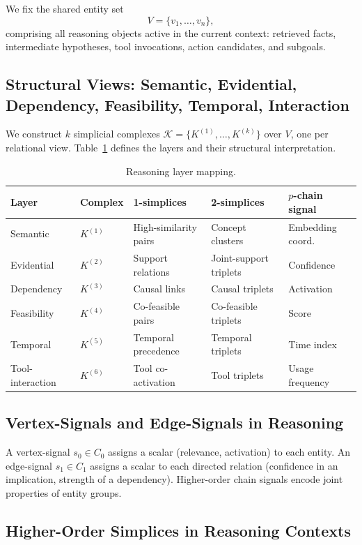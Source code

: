 \documentclass[11pt]{article}
\theoremstyle{definition}
\theoremstyle{remark}
\newcommand{\calK}{\mathcal{K}}
\begin{document}
We fix the shared entity set
\[
  V = \{v_1,\dots,v_n\},
\]
comprising all reasoning objects active in the current context: retrieved facts,
intermediate hypotheses, tool invocations, action candidates, and subgoals.

\subsection{Structural Views: Semantic, Evidential, Dependency, Feasibility, Temporal, Interaction}

We construct $k$ simplicial complexes $\calK = \{K^{(1)},\dots,K^{(k)}\}$
over $V$, one per relational view. Table~\ref{tab:layers} defines the layers
and their structural interpretation.

\begin{table}[h]
\centering
\caption{Reasoning layer mapping.}
\label{tab:layers}
\begin{tabular}{lllll}
\toprule
Layer & Complex & 1-simplices & 2-simplices & $p$-chain signal\\
\midrule
Semantic & $K^{(1)}$ & High-similarity pairs & Concept clusters & Embedding coord.\\
Evidential & $K^{(2)}$ & Support relations & Joint-support triplets & Confidence\\
Dependency & $K^{(3)}$ & Causal links & Causal triplets & Activation\\
Feasibility & $K^{(4)}$ & Co-feasible pairs & Co-feasible triplets & Score\\
Temporal & $K^{(5)}$ & Temporal precedence & Temporal triplets & Time index\\
Tool-interaction & $K^{(6)}$ & Tool co-activation & Tool triplets & Usage frequency\\
\bottomrule
\end{tabular}
\end{table}

\subsection{Vertex-Signals and Edge-Signals in Reasoning}

A vertex-signal $s_0\in C_0$ assigns a scalar (relevance, activation) to each
entity. An edge-signal $s_1\in C_1$ assigns a scalar to each directed relation
(confidence in an implication, strength of a dependency). Higher-order chain
signals encode joint properties of entity groups.

\subsection{Higher-Order Simplices in Reasoning Contexts}
\end{document}

